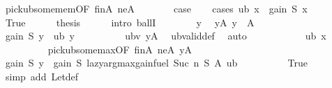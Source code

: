 \begin{isabellebody}
\ pick{\isacharunderscore}{\kern0pt}ub{\isacharunderscore}{\kern0pt}some{\isacharunderscore}{\kern0pt}mem{\isacharbrackleft}{\kern0pt}OF\ finA\ neA{\isacharbrackright}{\kern0pt}\ \isakeywordONE{{\isachardot}{\kern0pt}}\isamarkupfalse%
\isanewline
\ \ \isanewline
\ \ \isamarkupfalse%
\ {\isacharquery}{\kern0pt}case\isanewline
\ \ \isamarkupfalse%
\ {\isacharparenleft}{\kern0pt}cases\ {\isachardoublequoteopen}ub\ {\isacharquery}{\kern0pt}x\ {\isacharequal}{\kern0pt}\ gain\ S\ {\isacharquery}{\kern0pt}x{\isachardoublequoteclose}{\isacharparenright}{\kern0pt}\isanewline
\ \ \ \ \isamarkupfalse%
\ True\isanewline
\ \ \ \ \isamarkupfalse%
\ {\isacharquery}{\kern0pt}thesis\isanewline
\ \ \ \ \isamarkupfalse%
\ {\isacharparenleft}{\kern0pt}intro\ ballI{\isacharparenright}{\kern0pt}\isanewline
\ \ \ \ \ \ \isamarkupfalse%
\ y\ \isamarkupfalse%
\ yA{\isacharcolon}{\kern0pt}\ {\isachardoublequoteopen}y\ {\isasymin}\ A{\isachardoublequoteclose}\isanewline
\ \ \ \ \ \ \isamarkupfalse%
\ {\isachardoublequoteopen}gain\ S\ y\ {\isasymle}\ ub\ y{\isachardoublequoteclose}\isanewline
\ \ \ \ \ \ \ \ \isamarkupfalse%
\ ubv\ yA\ \isamarkupfalse%
\ ub{\isacharunderscore}{\kern0pt}valid{\isacharunderscore}{\kern0pt}def\ \isamarkupfalse%
\ auto\isanewline
\ \ \ \ \ \ \isamarkupfalse%
\ \isamarkupfalse%
\ {\isachardoublequoteopen}{\isasymdots}\ {\isasymle}\ ub\ {\isacharquery}{\kern0pt}x{\isachardoublequoteclose}\isanewline
\ \ \ \ \ \ \ \ \isamarkupfalse%
\ pick{\isacharunderscore}{\kern0pt}ub{\isacharunderscore}{\kern0pt}some{\isacharunderscore}{\kern0pt}max{\isacharbrackleft}{\kern0pt}OF\ finA\ neA\ yA{\isacharbrackright}{\kern0pt}\ \isakeywordONE{{\isachardot}{\kern0pt}}\isamarkupfalse%
\isanewline
\ \ \ \ \ \ \isamarkupfalse%
\ \isamarkupfalse%
\ {\isachardoublequoteopen}gain\ S\ y\ {\isasymle}\ gain\ S\ {\isacharparenleft}{\kern0pt}lazy{\isacharunderscore}{\kern0pt}argmax{\isacharunderscore}{\kern0pt}gain{\isacharunderscore}{\kern0pt}fuel\ {\isacharparenleft}{\kern0pt}Suc\ n{\isacharparenright}{\kern0pt}\ S\ A\ ub{\isacharparenright}{\kern0pt}{\isachardoublequoteclose}\isanewline
\ \ \ \ \ \ \ \ \isamarkupfalse%
\ True\ \isamarkupfalse%
\ {\isacharparenleft}{\kern0pt}simp\ add{\isacharcolon}{\kern0pt}\ Let{\isacharunderscore}{\kern0pt}def{\isacharparenright}{\kern0pt}\isanewline

\end{isabellebody}
